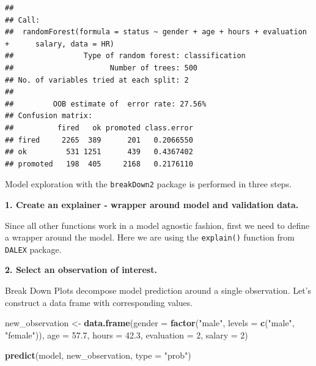 \documentclass[]{krantz}
\newenvironment{Shaded}{\begin{snugshade}}{\end{snugshade}}
\newcommand{\DataTypeTok}[1]{\textcolor[rgb]{0.13,0.29,0.53}{#1}}
\newcommand{\DecValTok}[1]{\textcolor[rgb]{0.00,0.00,0.81}{#1}}
\newcommand{\FloatTok}[1]{\textcolor[rgb]{0.00,0.00,0.81}{#1}}
\newcommand{\KeywordTok}[1]{\textcolor[rgb]{0.13,0.29,0.53}{\textbf{#1}}}
\newcommand{\NormalTok}[1]{#1}
\newcommand{\OperatorTok}[1]{\textcolor[rgb]{0.81,0.36,0.00}{\textbf{#1}}}
\newcommand{\StringTok}[1]{\textcolor[rgb]{0.31,0.60,0.02}{#1}}
\theoremstyle{definition}
\theoremstyle{definition}
\theoremstyle{definition}
\theoremstyle{remark}
\begin{document}
\begin{verbatim}
## 
## Call:
##  randomForest(formula = status ~ gender + age + hours + evaluation +      salary, data = HR) 
##                Type of random forest: classification
##                      Number of trees: 500
## No. of variables tried at each split: 2
## 
##         OOB estimate of  error rate: 27.56%
## Confusion matrix:
##          fired   ok promoted class.error
## fired     2265  389      201   0.2066550
## ok         531 1251      439   0.4367402
## promoted   198  405     2168   0.2176110
\end{verbatim}

Model exploration with the \texttt{breakDown2} package is performed in
three steps.

\textbf{1. Create an explainer - wrapper around model and validation
data.}

Since all other functions work in a model agnostic fashion, first we
need to define a wrapper around the model. Here we are using the
\texttt{explain()} function from \texttt{DALEX} package.

\begin{Shaded}
\end{Shaded}

\textbf{2. Select an observation of interest.}

Break Down Plots decompose model prediction around a single observation.
Let's construct a data frame with corresponding values.

\begin{Shaded}
\begin{Highlighting}[]
\NormalTok{new_observation <-}\StringTok{ }\KeywordTok{data.frame}\NormalTok{(}\DataTypeTok{gender =} \KeywordTok{factor}\NormalTok{(}\StringTok{"male"}\NormalTok{, }\DataTypeTok{levels =} \KeywordTok{c}\NormalTok{(}\StringTok{"male"}\NormalTok{, }\StringTok{"female"}\NormalTok{)),}
                      \DataTypeTok{age =} \FloatTok{57.7}\NormalTok{,}
                      \DataTypeTok{hours =} \FloatTok{42.3}\NormalTok{,}
                      \DataTypeTok{evaluation =} \DecValTok{2}\NormalTok{,}
                      \DataTypeTok{salary =} \DecValTok{2}\NormalTok{)}

\KeywordTok{predict}\NormalTok{(model, new_observation, }\DataTypeTok{type =} \StringTok{"prob"}\NormalTok{)}
\end{Highlighting}
\end{Shaded}
\end{document}
